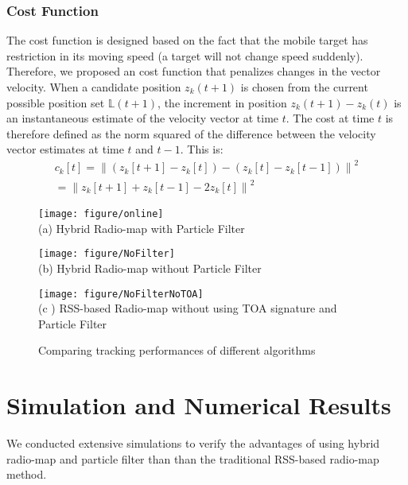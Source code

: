 \documentclass[conference, 10pt]{IEEEtran}
\begin{document}
 
\subsubsection{Cost Function} The cost function is designed based on the fact that the mobile target has restriction in its moving speed (a target will not change speed suddenly). Therefore, we proposed an cost function that penalizes changes in the vector velocity. When a candidate position $z_{k}(t+1)$ is chosen from the current possible position set $\mathbb{L}(t+1)$,  the increment in position $z_{k}(t+1)-z_{k}(t)$ is an instantaneous estimate of the velocity vector at time $t$. The cost at time $t$ is therefore defined as the norm squared of the difference between the velocity vector estimates at time $t$ and $t-1$. This is:
\begin{equation}
\begin{array}{c}
{c_k}[t] = {\left\| {\left( {{z_k}[t + 1] - {z_k}[t]} \right) - \left( {{z_k}[t] - {z_k}[t - 1]} \right)} \right\|^2}\\
 = {\left\| {{z_k}[t + 1] + {z_k}[t - 1] - 2{z_k}[t]} \right\|^2}
\end{array}
\end{equation}
\begin{figure*}[t]
  \begin{minipage}[t]{0.33\linewidth} 
    \centering 
    \texttt{[image: figure/online]} \\
    (a) Hybrid Radio-map with Particle Filter
  \end{minipage}\begin{minipage}[t]{0.33\linewidth} 
    \centering 
    \texttt{[image: figure/NoFilter]} \\
   (b) Hybrid Radio-map without Particle Filter
  \end{minipage}\begin{minipage}[t]{0.33\linewidth} 
    \centering 
    \texttt{[image: figure/NoFilterNoTOA]} \\
    (c ) RSS-based Radio-map without using TOA signature and Particle Filter
  \end{minipage}\caption{Comparing tracking performances of different algorithms}
    \label{fig6}
\end{figure*}
\section{Simulation and Numerical Results} 
We conducted extensive simulations to verify the advantages of using hybrid radio-map and particle filter than than the traditional RSS-based radio-map method. 
\end{document}
